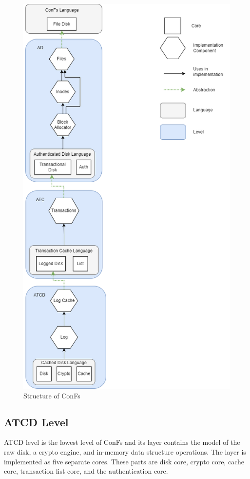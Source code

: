 \begin{figure}[H]
    \centering
    \includegraphics[scale=0.5]{templates/figures/ConFs Layers.png}
    \caption{Structure of ConFs}
    \label{fig:ConFs_Layers}
\end{figure}

\subsection{ATCD Level}
ATCD level is the lowest level of ConFs and its layer contains the model of the raw disk, a crypto engine, and in-memory data structure operations. The layer is implemented as five separate cores. These parts are disk core, crypto core, cache core, transaction list core, and the authentication core. 

